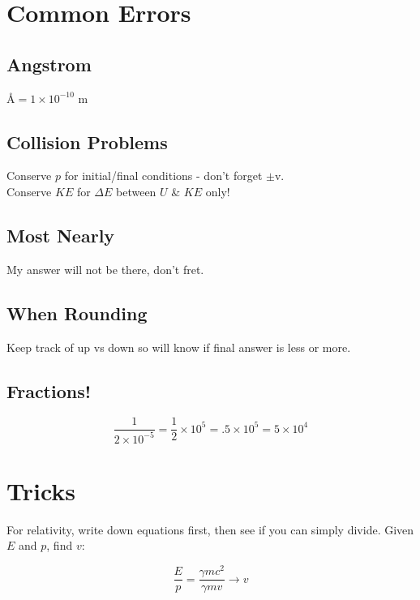 \documentclass[10pt,letter]{article}
\begin{document}


\section{Common Errors} %
\label{sec:common_errors}
\subsection{Angstrom} %
\label{sub:angstrom}
\AA $= 1 \times 10^{-10}$ m

\subsection{Collision Problems} %
\label{sub:collision_problems}
Conserve $p$ for initial/final conditions - don't forget $\pm$v. \\
Conserve $KE$ for $\Delta E$ between $U$ \& $KE$ only!

\subsection{Most Nearly} %
\label{sub:most_nearly}
My answer will not be there, don't fret.

\subsection{When Rounding} %
\label{sub:when_rounding}
Keep track of up vs down so will know if final answer is less or more.

\subsection{Fractions!} %
\label{sub:fractions_}
\begin{equation}
    \frac{1}{2 \times 10^{-5}} = \frac{1}{2}\times 10^{5} = .5 \times 10^{5} = 5 \times 10^4
\end{equation}


\section{Tricks} %
\label{sec:tricks}
For relativity, write down equations first, then see if you can simply divide. Given $E$ and $p$, find $v$:

\begin{equation}
\frac{E}{p} = \frac{\gamma mc^2}{\gamma mv} \rightarrow v
\end{equation}
\end{document}
